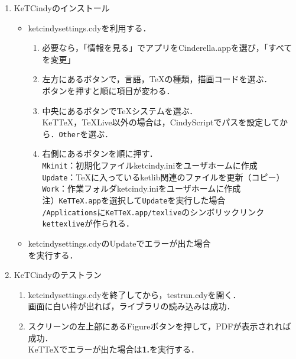 \documentclass{ujarticle}
\begin{document}
\begin{enumerate}[\bf\large 1.]
\item KeTCindyのインストール
\begin{itemize}
\item ketcindysettings.cdyを利用する．
\begin{enumerate}[(1)]
\item 必要なら，「情報を見る」でアプリをCinderella.appを選び，「すべてを変更」
\item 左方にあるボタンで，言語，TeXの種類，描画コードを選ぶ．\\
\hspace*{10mm}ボタンを押すと順に項目が変わる．
\item 中央にあるボタンでTeXシステムを選ぶ．\\
\hspace*{10mm}KeTTeX，TeXLive以外の場合は，CindyScriptでパスを設定してから．\verb|Other|を選ぶ．
\item 右側にあるボタンを順に押す．\\
\hspace*{10mm}\verb|Mkinit|：初期化ファイルketcindy.iniをユーザホームに作成\\
\hspace*{10mm}\verb|Update|：TeXに入っているketlib関連のファイルを更新（コピー）\\
\hspace*{10mm}\verb|Work|：作業フォルダketcindy.iniをユーザホームに作成\\
\hspace*{1mm}注）\verb|KeTTeX.app|を選択して\verb|Update|を実行した場合\\
\hspace*{13mm}\verb|/Applications|に\verb|KeTTeX.app/texlive|のシンボリックリンク\verb|kettexlive|が作られる．
\end{enumerate}
\item ketcindysettings.cdyのUpdateでエラーが出た場合\\
\hspace*{10mm}{\bf 1.}を実行する．
\end{itemize}

  \item KeTCindyのテストラン
    \begin{enumerate}[(1)]
    \item ketcindysettings.cdyを終了してから，testrun.cdyを開く．\\
      \hspace*{10mm}画面に白い枠が出れば，ライブラリの読み込みは成功．
    \item スクリーンの左上部にあるFigureボタンを押して，PDFが表示されれば成功．\\
\hspace*{10mm}KeTTeXでエラーが出た場合は{\bf 1.}を実行する．
\end{enumerate}


\end{enumerate}
\end{document}

